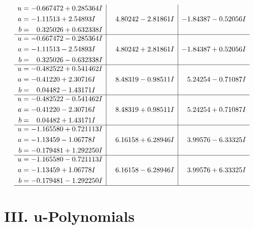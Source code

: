 \documentclass[1p]{elsarticle_modified}
\theoremstyle{definition}
\begin{document}
$$\begin{array}{c|c|c}
\begin{aligned}
u &= -0.667472 + 0.285364 I \\
a &= -1.11513 + 2.54893 I \\
b &= \phantom{-}0.325026 + 0.632338 I\end{aligned}
 & \phantom{-}4.80242 - 2.81861 I & -1.84387 - 0.52056 I \\ \hline\begin{aligned}
u &= -0.667472 - 0.285364 I \\
a &= -1.11513 - 2.54893 I \\
b &= \phantom{-}0.325026 - 0.632338 I\end{aligned}
 & \phantom{-}4.80242 + 2.81861 I & -1.84387 + 0.52056 I \\ \hline\begin{aligned}
u &= -0.482522 + 0.541462 I \\
a &= -0.41220 + 2.30716 I \\
b &= \phantom{-}0.04482 - 1.43171 I\end{aligned}
 & \phantom{-}8.48319 - 0.98511 I & \phantom{-}5.24254 - 0.71087 I \\ \hline\begin{aligned}
u &= -0.482522 - 0.541462 I \\
a &= -0.41220 - 2.30716 I \\
b &= \phantom{-}0.04482 + 1.43171 I\end{aligned}
 & \phantom{-}8.48319 + 0.98511 I & \phantom{-}5.24254 + 0.71087 I \\ \hline\begin{aligned}
u &= -1.165580 + 0.721113 I \\
a &= -1.13459 - 1.06778 I \\
b &= -0.179481 + 1.292250 I\end{aligned}
 & \phantom{-}6.16158 + 6.28946 I & \phantom{-}3.99576 - 6.33325 I \\ \hline\begin{aligned}
u &= -1.165580 - 0.721113 I \\
a &= -1.13459 + 1.06778 I \\
b &= -0.179481 - 1.292250 I\end{aligned}
 & \phantom{-}6.16158 - 6.28946 I & \phantom{-}3.99576 + 6.33325 I\\
 \hline 
 \end{array}$$\newpage
\newpage\renewcommand{\arraystretch}{1}
\centering \section*{ III. u-Polynomials}
\end{document}
